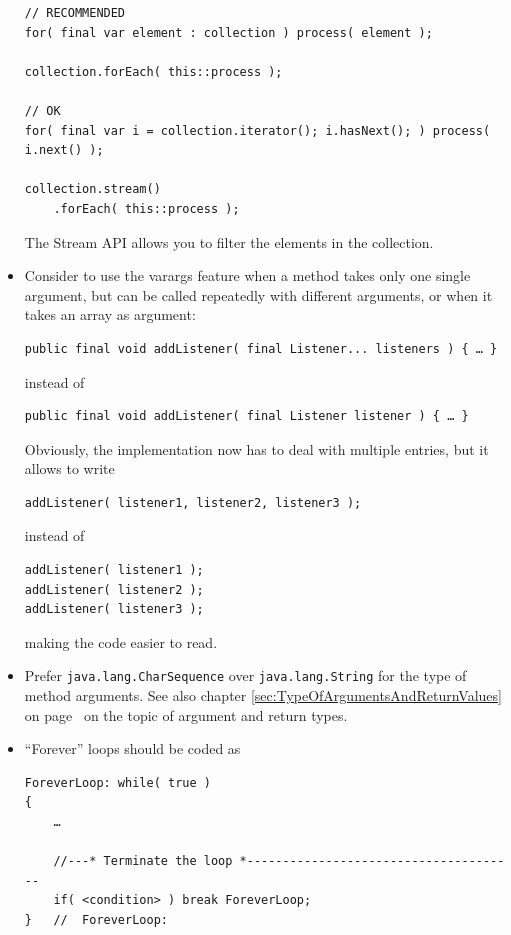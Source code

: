 \documentclass[11pt,a4paper, titlepage, parskip=half, headsepline, footsepline, cleardoublepage=current, headheight=1cm]{scrbook}
\newcommand*{\tqvref}[1]{\hyperref[{#1}]{\ref*{#1}} on page~\pageref{#1}}
\begin{document}
\begin{itemize}
{\begin{lstlisting}
// RECOMMENDED
for( final var element : collection ) process( element );

collection.forEach( this::process );

// OK
for( final var i = collection.iterator(); i.hasNext(); ) process( i.next() );

collection.stream()
    .forEach( this::process );
\end{lstlisting}

The Stream API allows you to filter the elements in the collection.}

\item{Consider to use the varargs feature when a method takes only one single argument, but can be called repeatedly with different arguments, or when it takes an array as argument:

\begin{lstlisting}
public final void addListener( final Listener... listeners ) { … }
\end{lstlisting}

instead of
\begin{lstlisting}
public final void addListener( final Listener listener ) { … }
\end{lstlisting}

Obviously, the implementation now has to deal with multiple entries, but it allows to write
\begin{lstlisting}
addListener( listener1, listener2, listener3 );
\end{lstlisting}
instead of
\begin{lstlisting}
addListener( listener1 );
addListener( listener2 );
addListener( listener3 );
\end{lstlisting}
making the code easier to read.}

\item{Prefer \lstinline|java.lang.CharSequence|\autocite{ORACLE_DOC_CHARSEQUENCE_INTERFACE} over \lstinline|java.lang.String| for the type of method arguments. See also chapter \tqvref{sec:TypeOfArgumentsAndReturnValues} on the topic of argument and return types.}

\item{“Forever” loops should be coded as
\begin{lstlisting}
ForeverLoop: while( true ) 
{ 
    … 
    
    //---* Terminate the loop *--------------------------------------
    if( <condition> ) break ForeverLoop;
}   //  ForeverLoop:
\end{lstlisting} }


\end{itemize}
\end{document}
